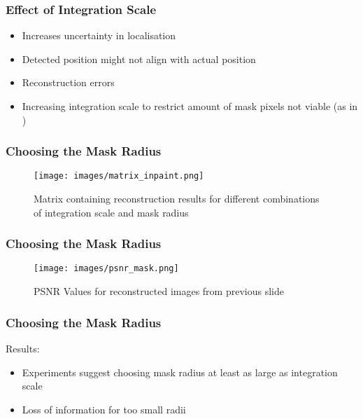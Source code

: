 \documentclass{beamer}
\begin{document}
    \begin{frame}[t]
        \frametitle{Effect of Integration Scale}
         {\begin{itemize}
            \item<+-|alert@+> Increases uncertainty in localisation
            \item<+-|alert@+> Detected position might not align with actual position
            \item<4-|alert@4> Reconstruction errors
            \item<5-|alert@5> Increasing integration scale to restrict amount of mask pixels not viable (as in
                \cite{zimmer07})
    \end{itemize}}
    \end{frame}

    \begin{frame}[t]
        \frametitle{Choosing the Mask Radius}
        \begin{figure}[htpb]
            \centering
            \texttt{[image: images/matrix\_inpaint.png]}
            \caption{Matrix containing reconstruction results for different combinations of
            integration scale and mask radius}
        \end{figure}
    \end{frame}

    \begin{frame}
        \frametitle{Choosing the Mask Radius}
        \begin{figure}[htpb]
            \centering
            \texttt{[image: images/psnr\_mask.png]}
            \caption{PSNR Values for reconstructed images from previous slide}
        \end{figure}
    \end{frame}

    \begin{frame}[t]
        \frametitle{Choosing the Mask Radius}
        Results:
        \begin{itemize}[<+-|alert@+>]
            \item Experiments suggest choosing mask radius at least as large as integration
                scale
            \item Loss of information for too small radii
        \end{itemize}
    \end{frame}
\end{document}
